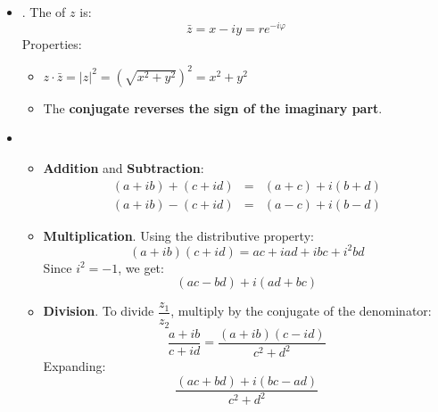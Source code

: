 \begin{itemize}
    \item {}. The  of $z$ is:
    \begin{equation*}
        \bar{z} = x - iy = r e^{-i \varphi}
    \end{equation*}
    Properties:
    \begin{itemize}
        \item $ z \cdot \bar{z} = \left|z\right|^{2} = \left(\sqrt{x^{2} + y^{2}}\right)^{2} = x^{2} + y^{2} $
        \item The \textbf{conjugate reverses the sign of the imaginary part}.
    \end{itemize}

    \item {}
    \begin{itemize}
        \item \textbf{Addition} and \textbf{Subtraction}:
        \begin{equation*}
            \begin{array}{rcl}
                \left(a + ib\right) + \left(c + id\right) &=& \left(a+c\right) + i\left(b+d\right) \\ [.5em]
                \left(a + ib\right) - \left(c + id\right) &=& \left(a-c\right) + i\left(b-d\right)
            \end{array}
        \end{equation*}
        \item \textbf{Multiplication}. Using the distributive property:
        \begin{equation*}
            \left(a + ib\right)\left(c + id\right) = ac + iad + ibc + i^2bd
        \end{equation*}
        Since $i^2 = -1$, we get:
        \begin{equation*}
            \left(ac - bd\right) + i\left(ad + bc\right)
        \end{equation*}
        \item \textbf{Division}. To divide $\dfrac{z_1}{z_2}$, multiply by the conjugate of the denominator:
        \begin{equation*}
            \frac{a + ib}{c + id} = \frac{(a+ib)(c-id)}{c^2 + d^2}
        \end{equation*}
        Expanding:
        \begin{equation*}
            \frac{(ac + bd) + i(bc - ad)}{c^2 + d^2}
        \end{equation*}
    \end{itemize}


\end{itemize}
